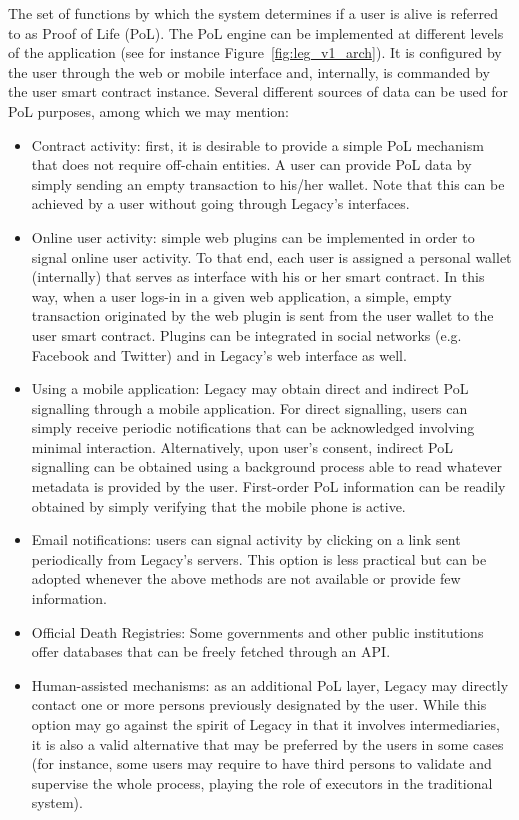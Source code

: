 The set of functions by which the system determines if a user is alive is referred to as Proof of Life (PoL). The PoL engine can be implemented at different levels of the application (see for instance Figure~\ref{fig:leg_v1_arch}). It is configured by the user through the web or mobile interface and, internally, is commanded by the user smart contract instance. Several different sources of data can be used for PoL purposes, among which we may mention:
\begin{itemize}
	\item Contract activity: first, it is desirable to provide a simple PoL mechanism that does not require off-chain entities. A user can provide PoL data by simply sending an empty transaction to his/her wallet. Note that this can be achieved by a user without going through Legacy's interfaces.

	\item Online user activity: simple web plugins can be implemented in order to signal online user activity. To that end, each user is assigned a personal wallet (internally) that serves as interface with his or her smart contract. In this way, when a user logs-in in a given web application, a simple, empty transaction originated by the web plugin is sent from the user wallet to the user smart contract. Plugins can be integrated in social networks (e.g. Facebook and Twitter) and in Legacy's web interface as well.

	\item Using a mobile application: Legacy may obtain direct and indirect PoL signalling through a mobile application. For direct signalling, users can simply receive periodic notifications that can be acknowledged involving minimal interaction. Alternatively, upon user's consent, indirect PoL signalling can be obtained using a background process able to read whatever metadata is provided by the user. First-order PoL information can be readily obtained by simply verifying that the mobile phone is active.

	\item Email notifications: users can signal activity by clicking on a link sent periodically from Legacy’s servers. This option is less practical but can be adopted whenever the above methods are not available or provide few information.

	\item Official Death Registries: Some governments and other public institutions offer databases that can be freely fetched through an API.

	\item Human-assisted mechanisms: as an additional PoL layer, Legacy may directly contact one or more persons previously designated by the user. 	
	While this option may go against the spirit of Legacy in that it involves intermediaries, it is also a valid alternative that may be preferred by the users in some cases (for instance, some users may require to have third persons to validate and supervise the whole process, playing the role of executors in the traditional system).
\end{itemize}

